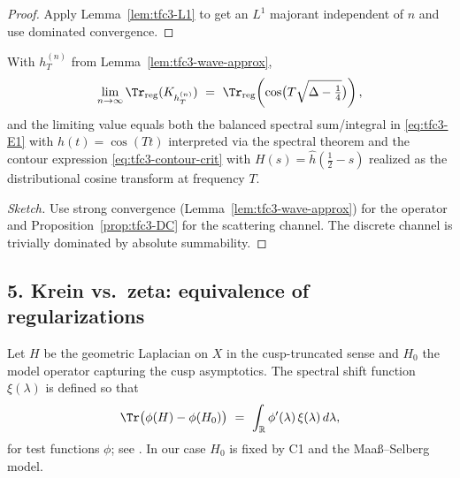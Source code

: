 \begin{proof}\relax\hspace{0pt}
Apply Lemma~\ref{lem:tfc3-L1} to get an $L^1$ majorant independent of $n$ and use dominated convergence.\relax\hspace{0pt}
\end{proof}

\begin{theorem}\relax\hspace{0pt}
\label{thm:tfc3-wave-trace} %
With $h_T^{(n)}$ from Lemma~\ref{lem:tfc3-wave-approx}, 
\[
\lim_{n\to\infty}\Tr_{\mathrm{reg}}(K_{h_T^{(n)}})\ =\ \Tr_{\mathrm{reg}}\!\left(\cos\!\big(T\sqrt{\Delta-\tfrac14}\big)\right),
\]
and the limiting value equals both the balanced spectral sum/integral in \eqref{eq:tfc3-E1} with $h(t)=\cos(Tt)$ interpreted via the spectral theorem and the contour expression \eqref{eq:tfc3-contour-crit} with $H(s)=\widehat{h}(\tfrac12-s)$ realized as the distributional cosine transform at frequency $T$.\relax\hspace{0pt}
\end{theorem}

\begin{proof}[Sketch]\relax\hspace{0pt}
Use strong convergence (Lemma~\ref{lem:tfc3-wave-approx}) for the operator and Proposition~\ref{prop:tfc3-DC} for the scattering channel. The discrete channel is trivially dominated by absolute summability.\relax\hspace{0pt}
\end{proof}

\subsection*{5. Krein vs.\ zeta: equivalence of regularizations}\relax\hspace{0pt}
\label{subsec:tfc3-Krein-zeta} %

\begin{definition}\relax\hspace{0pt}
\label{def:tfc3-Krein} %
Let $H$ be the geometric Laplacian on $X$ in the cusp-truncated sense and $H_0$ the model operator capturing the cusp asymptotics. The spectral shift function $\xi(\lambda)$ is defined so that
\[
\Tr\big(\phi(H)-\phi(H_0)\big)\ =\ \int_{\mathbb{R}}\phi'(\lambda)\,\xi(\lambda)\,d\lambda,
\]
for test functions $\phi$; see \cite{Krein,BullaGesztesy}. In our case $H_0$ is fixed by C1 and the Maaß--Selberg model.\relax\hspace{0pt}
\end{definition}

